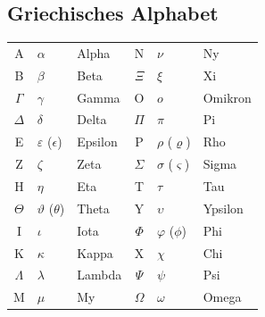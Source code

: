 \begin{appendices}
\chapter{Griechisches Alphabet}
\begin{table}[h!]
	\begin{tabular}{c p{} p{} c p{} l}
		A & $\alpha$ & Alpha 			& N & $\nu$ & Ny \\
		B & $\beta$ & Beta 			& $\Xi$ & $\xi$ & Xi \\
		$\Gamma$ & $\gamma$ & Gamma 		& O & $o$ & Omikron \\
		$\Delta$ & $\delta$ & Delta 		& $\Pi$ & $\pi$ & Pi \\
		E & $\varepsilon$ ($\epsilon$) & Epsilon & P & $\rho$ ($\varrho$) & Rho \\
		Z & $\zeta$ & Zeta 			& $\Sigma$ & $\sigma$ ($\varsigma$) & Sigma \\
		H & $\eta$ & Eta 			& T & $\tau$ & Tau \\
		$\Theta$ & $\vartheta$ ($\theta$) & Theta & Y & $\upsilon$ & Ypsilon \\
		I & $\iota$ & Iota 			& $\Phi$ & $\varphi$ ($\phi$) & Phi \\
		K & $\kappa$ & Kappa 			& X & $\chi$ & Chi \\
		$\Lambda$ & $\lambda$ & Lambda 		& $\Psi$ & $\psi$ & Psi \\
		M & $\mu$ & My 				& $\Omega$ & $\omega$ & Omega \\
	\end{tabular}
\end{table}

\end{appendices}
